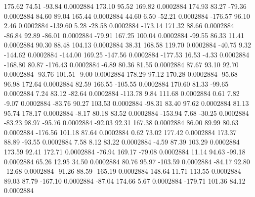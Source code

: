       175.62       74.51      -93.84     0.0002884
      173.10       95.52      169.82     0.0002884
      174.93       83.27      -79.36     0.0002884
       84.60       89.04      165.44     0.0002884
       44.60        6.50      -52.21     0.0002884
     -176.57       96.10        2.46     0.0002884
     -139.60        5.28      -28.58     0.0002884
     -173.14      171.32       88.66     0.0002884
      -86.84       92.89      -86.01     0.0002884
      -79.91      167.25      100.04     0.0002884
      -99.55       86.33       11.41     0.0002884
       90.30       88.48      104.13     0.0002884
       38.31      168.58      119.70     0.0002884
      -40.75        9.32     -144.62     0.0002884
     -144.00      169.25     -147.56     0.0002884
     -177.53       16.53       -4.33     0.0002884
     -168.80       80.87     -176.43     0.0002884
       -6.89       80.36       81.55     0.0002884
       87.67       93.10       92.70     0.0002884
      -93.76      101.51       -9.00     0.0002884
      178.29       97.12      170.28     0.0002884
      -95.68       96.98      172.64     0.0002884
       82.59      166.55     -105.55     0.0002884
      170.60       81.33      -99.65     0.0002884
        7.24       83.12      -82.64     0.0002884
     -113.78        9.84      111.68     0.0002884
        0.61        7.82       -9.07     0.0002884
      -83.76       90.27      103.53     0.0002884
      -98.31       83.40       97.62     0.0002884
       81.13       95.74      178.17     0.0002884
       -8.17       80.18       83.52     0.0002884
     -153.94        7.68      -30.25     0.0002884
      -83.23       98.97      -95.76     0.0002884
      -92.03       92.31      167.38     0.0002884
       86.00       89.99       80.63     0.0002884
     -176.56      101.18       87.64     0.0002884
        0.62       73.02      177.42     0.0002884
      173.37       88.89      -93.55     0.0002884
        7.58        8.12       83.22     0.0002884
       -4.59       87.39      103.29     0.0002884
      173.59       92.41      172.71     0.0002884
      -76.94      169.17      -79.08     0.0002884
       11.14       94.63      -99.18     0.0002884
       65.26       12.95       34.50     0.0002884
       80.76       95.97     -103.59     0.0002884
      -84.17       92.80      -12.68     0.0002884
      -91.26       88.59     -165.19     0.0002884
      148.64       11.71      113.55     0.0002884
       89.03       87.79     -167.10     0.0002884
      -87.04      174.66        5.67     0.0002884
     -179.71      101.36       84.12     0.0002884
